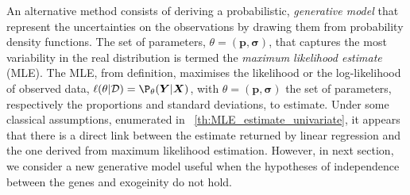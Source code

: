\documentclass[long, final]{jobim}
\begin{document}
An alternative method consists of deriving a probabilistic, \textit{generative model} that represent the uncertainties on the observations by drawing them from probability density functions. The set of parameters, $\theta=(\boldsymbol{p}, \boldsymbol{\sigma})$, that captures the most variability in the real distribution is termed the \textit{maximum likelihood estimate} (MLE). The MLE, from definition, maximises the likelihood or the log-likelihood of observed data, $\ell(\theta|\mathcal{D})=\P_{\theta}(\boldsymbol{Y}|\boldsymbol{X})$, with $\theta=(\boldsymbol{p}, \boldsymbol{\sigma})$ the set of parameters, respectively the proportions and standard deviations, to estimate. Under some classical assumptions, enumerated in \theoremname~\ref{th:MLE_estimate_univariate}, it appears that there is a direct link between the estimate returned by linear regression and the one derived from maximum likelihood estimation. However, in next section, we consider a new generative model useful when the hypotheses of independence between the genes and exogeinity do not hold.
\end{document}
